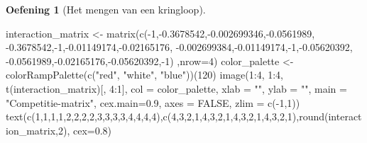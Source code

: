 \documentclass[
  a4paper,
]{scrbook}
\newenvironment{Shaded}{\begin{snugshade}}{\end{snugshade}}
\newcommand{\AttributeTok}[1]{\textcolor[rgb]{0.40,0.45,0.13}{#1}}
\newcommand{\ConstantTok}[1]{\textcolor[rgb]{0.56,0.35,0.01}{#1}}
\newcommand{\DecValTok}[1]{\textcolor[rgb]{0.68,0.00,0.00}{#1}}
\newcommand{\FloatTok}[1]{\textcolor[rgb]{0.68,0.00,0.00}{#1}}
\newcommand{\FunctionTok}[1]{\textcolor[rgb]{0.28,0.35,0.67}{#1}}
\newcommand{\NormalTok}[1]{\textcolor[rgb]{0.00,0.23,0.31}{#1}}
\newcommand{\OtherTok}[1]{\textcolor[rgb]{0.00,0.23,0.31}{#1}}
\newcommand{\SpecialCharTok}[1]{\textcolor[rgb]{0.37,0.37,0.37}{#1}}
\newcommand{\StringTok}[1]{\textcolor[rgb]{0.13,0.47,0.30}{#1}}
\theoremstyle{definition}
\newtheorem{exercise}{Oefening}[chapter]
\theoremstyle{remark}
\begin{document}
\begin{exercise}[Het mengen van een
kringloop]
\begin{Shaded}
\begin{Highlighting}[]
\NormalTok{  interaction\_matrix }\OtherTok{\textless{}{-}} \FunctionTok{matrix}\NormalTok{(}\FunctionTok{c}\NormalTok{(}\SpecialCharTok{{-}}\DecValTok{1}\NormalTok{,}\SpecialCharTok{{-}}\FloatTok{0.3678542}\NormalTok{,}\SpecialCharTok{{-}}\FloatTok{0.002699346}\NormalTok{,}\SpecialCharTok{{-}}\FloatTok{0.0561989}\NormalTok{,}
        \SpecialCharTok{{-}}\FloatTok{0.3678542}\NormalTok{,}\SpecialCharTok{{-}}\DecValTok{1}\NormalTok{,}\SpecialCharTok{{-}}\FloatTok{0.01149174}\NormalTok{,}\SpecialCharTok{{-}}\FloatTok{0.02165176}\NormalTok{,}
        \SpecialCharTok{{-}}\FloatTok{0.002699384}\NormalTok{,}\SpecialCharTok{{-}}\FloatTok{0.01149174}\NormalTok{,}\SpecialCharTok{{-}}\DecValTok{1}\NormalTok{,}\SpecialCharTok{{-}}\FloatTok{0.05620392}\NormalTok{,}
        \SpecialCharTok{{-}}\FloatTok{0.0561989}\NormalTok{,}\SpecialCharTok{{-}}\FloatTok{0.02165176}\NormalTok{,}\SpecialCharTok{{-}}\FloatTok{0.05620392}\NormalTok{,}\SpecialCharTok{{-}}\DecValTok{1}\NormalTok{)}
\NormalTok{                               ,}\AttributeTok{nrow=}\DecValTok{4}\NormalTok{)}
\NormalTok{  color\_palette }\OtherTok{\textless{}{-}} \FunctionTok{colorRampPalette}\NormalTok{(}\FunctionTok{c}\NormalTok{(}\StringTok{"red"}\NormalTok{, }\StringTok{"white"}\NormalTok{, }\StringTok{"blue"}\NormalTok{))(}\DecValTok{120}\NormalTok{)}
\FunctionTok{image}\NormalTok{(}\DecValTok{1}\SpecialCharTok{:}\DecValTok{4}\NormalTok{, }\DecValTok{1}\SpecialCharTok{:}\DecValTok{4}\NormalTok{, }
      \FunctionTok{t}\NormalTok{(interaction\_matrix)[, }\DecValTok{4}\SpecialCharTok{:}\DecValTok{1}\NormalTok{], }
      \AttributeTok{col =}\NormalTok{ color\_palette, }
      \AttributeTok{xlab =} \StringTok{""}\NormalTok{, }\AttributeTok{ylab =} \StringTok{""}\NormalTok{, }
      \AttributeTok{main =} \StringTok{"Competitie{-}matrix"}\NormalTok{,}
      \AttributeTok{cex.main=}\FloatTok{0.9}\NormalTok{, }\AttributeTok{axes =} \ConstantTok{FALSE}\NormalTok{, }
      \AttributeTok{zlim =} \FunctionTok{c}\NormalTok{(}\SpecialCharTok{{-}}\DecValTok{1}\NormalTok{,}\DecValTok{1}\NormalTok{))}
\FunctionTok{text}\NormalTok{(}\FunctionTok{c}\NormalTok{(}\DecValTok{1}\NormalTok{,}\DecValTok{1}\NormalTok{,}\DecValTok{1}\NormalTok{,}\DecValTok{1}\NormalTok{,}\DecValTok{2}\NormalTok{,}\DecValTok{2}\NormalTok{,}\DecValTok{2}\NormalTok{,}\DecValTok{2}\NormalTok{,}\DecValTok{3}\NormalTok{,}\DecValTok{3}\NormalTok{,}\DecValTok{3}\NormalTok{,}\DecValTok{3}\NormalTok{,}\DecValTok{4}\NormalTok{,}\DecValTok{4}\NormalTok{,}\DecValTok{4}\NormalTok{,}\DecValTok{4}\NormalTok{),}\FunctionTok{c}\NormalTok{(}\DecValTok{4}\NormalTok{,}\DecValTok{3}\NormalTok{,}\DecValTok{2}\NormalTok{,}\DecValTok{1}\NormalTok{,}\DecValTok{4}\NormalTok{,}\DecValTok{3}\NormalTok{,}\DecValTok{2}\NormalTok{,}\DecValTok{1}\NormalTok{,}\DecValTok{4}\NormalTok{,}\DecValTok{3}\NormalTok{,}\DecValTok{2}\NormalTok{,}\DecValTok{1}\NormalTok{,}\DecValTok{4}\NormalTok{,}\DecValTok{3}\NormalTok{,}\DecValTok{2}\NormalTok{,}\DecValTok{1}\NormalTok{),}\FunctionTok{round}\NormalTok{(interaction\_matrix,}\DecValTok{2}\NormalTok{), }\AttributeTok{cex=}\FloatTok{0.8}\NormalTok{)}

\end{Highlighting}
\end{Shaded}
\end{exercise}
\end{document}
